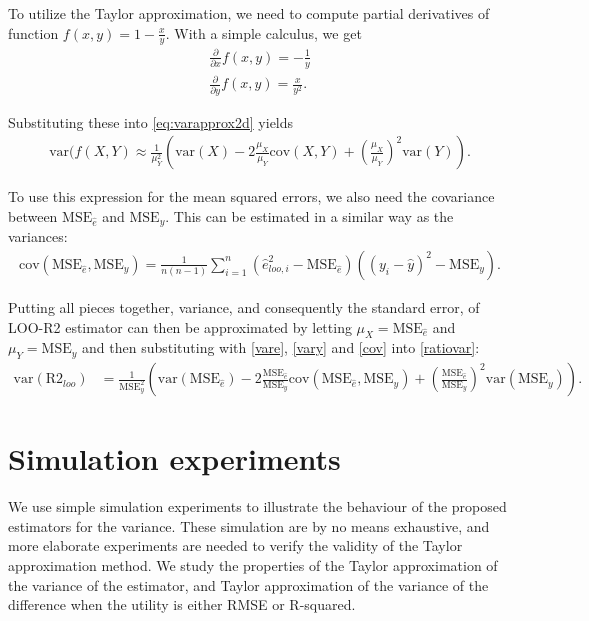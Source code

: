 \documentclass{article}
\begin{document}
To utilize the Taylor approximation, we need to compute partial derivatives of function $f(x,y) = 1 - \frac{x}{y}$. With a simple calculus, we get
\begin{align}
    \frac{\partial}{\partial x}f(x,y) = -\frac{1}{y} \\
    \frac{\partial}{\partial y}f(x,y) = \frac{x}{y^2}.
\end{align}

Substituting these into \eqref{eq:varapprox2d} yields
\begin{align}
    \text{var}(f(X, Y) \approx \frac{1}{\mu_Y^2} \left( \text{var}(X) - 2 \frac{\mu_X}{\mu_Y} \text{cov}(X,Y) + \left( \frac{\mu_X}{\mu_Y} \right)^2 \text{var}(Y) \right) \label{ratiovar}.
\end{align}

 To use this expression for the mean squared errors, we also need the covariance between $\text{MSE}_{\hat{e}}$ and $\text{MSE}_y$. This can be estimated in a similar way as the variances:
 \begin{align}
     \text{cov}(\text{MSE}_{\hat{e}}, \text{MSE}_{y} ) = \frac{1}{n (n -1 )} \sum_{i = 1}^n \left( \hat{e}_{loo, i}^2 - \text{MSE}_{\hat{e}} \right) \left( (y_i - \hat{y})^2 -\text{MSE}_y \right) \label{cov}.
 \end{align}
 
 Putting all pieces together, variance, and consequently the standard error, of LOO-R2 estimator can then be approximated by letting $\mu_X = \text{MSE}_{\hat{e}}$ and $\mu_Y = \text{MSE}_y$ and then substituting with \eqref{vare}, \eqref{vary} and \eqref{cov} into \eqref{ratiovar}:
 \begin{align}
     \text{var}(\text{R2}_{loo}) &= \frac{1}{\text{MSE}_y^2} \left( \text{var}(\text{MSE}_{\hat{e}}) - 2 \frac{\text{MSE}_{\hat{e}}}{\text{MSE}_y} \text{cov}(\text{MSE}_{\hat{e}}, \text{MSE}_{y} ) +  \left( \frac{\text{MSE}_{\hat{e}}}{\text{MSE}_y} \right)^2 \text{var}(\text{MSE}_y) \right) \label{eq:var-loo-r2}.
 \end{align}
 
\section{Simulation experiments}
We use simple simulation experiments to illustrate the behaviour of the proposed estimators for the variance. These simulation are by no means exhaustive, and more elaborate experiments are needed to verify the validity of the Taylor approximation method. We study the properties of the Taylor approximation of the variance of the estimator, and Taylor approximation of the variance of the difference when the utility is either RMSE or R-squared.
\end{document}
